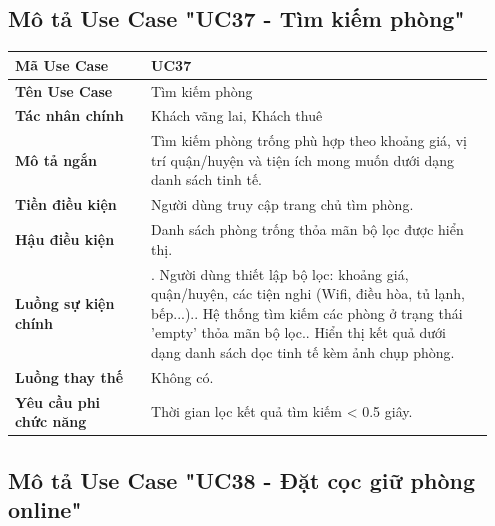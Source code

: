 \subsection{Mô tả Use Case "UC37 - Tìm kiếm phòng"}

\begin{longtable}[]{@{}>{\RaggedRight\arraybackslash}p{0.27\linewidth}>{\RaggedRight\arraybackslash}p{0.68\linewidth}@{}}
\toprule
\textbf{Mã Use Case} & UC37\tabularnewline
\midrule
\endhead
\textbf{Tên Use Case} & Tìm kiếm phòng\tabularnewline
\textbf{Tác nhân chính} & Khách vãng lai, Khách thuê\tabularnewline
\textbf{Mô tả ngắn} & Tìm kiếm phòng trống phù hợp theo khoảng giá, vị
trí quận/huyện và tiện ích mong muốn dưới dạng danh sách tinh
tế.\tabularnewline
\textbf{Tiền điều kiện} & Người dùng truy cập trang chủ tìm
phòng.\tabularnewline
\textbf{Hậu điều kiện} & Danh sách phòng trống thỏa mãn bộ lọc được hiển
thị.\tabularnewline
\textbf{Luồng sự kiện chính} & 1. Người dùng thiết
lập bộ lọc: khoảng giá, quận/huyện, các tiện nghi (Wifi, điều hòa, tủ
lạnh, bếp...).\newline 2. Hệ thống tìm kiếm các phòng ở trạng thái
'empty' thỏa mãn bộ lọc.\newline 3. Hiển thị kết quả dưới dạng danh
sách dọc tinh tế kèm ảnh chụp phòng.\tabularnewline
\textbf{Luồng thay thế} & Không có.\tabularnewline
\textbf{Yêu cầu phi chức năng} & Thời gian lọc kết quả tìm kiếm
\textless{} 0.5 giây.\tabularnewline
\bottomrule
\end{longtable}

\subsection{Mô tả Use Case "UC38 - Đặt cọc giữ phòng online"}

